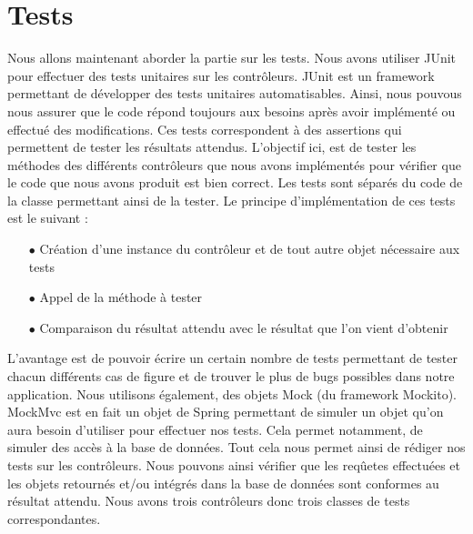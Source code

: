 \documentclass[a4paper]{report}
\begin{document}
\chapter{Tests}


Nous allons maintenant aborder la partie sur les tests. Nous avons utiliser JUnit pour effectuer des tests unitaires sur les contrôleurs. JUnit est un framework permettant de développer des tests unitaires
automatisables. Ainsi, nous pouvous nous assurer que le code répond toujours aux besoins après avoir implémenté ou effectué des modifications. Ces tests correspondent à des assertions qui permettent de tester les résultats 
attendus. L'objectif ici, est de tester les méthodes des différents contrôleurs que nous avons implémentés pour vérifier que le code que nous avons produit est bien correct.
Les tests sont séparés du code de la classe permettant ainsi de la tester. Le principe d'implémentation de ces tests est le suivant : \newline
\begin{itemize}
    \item[$\bullet$] Création d'une instance du contrôleur et de tout autre objet nécessaire aux tests
    \item[$\bullet$] Appel de la méthode à tester
    \item[$\bullet$] Comparaison du résultat attendu avec le résultat que l'on vient d'obtenir \newline
\end{itemize}
L'avantage est de pouvoir écrire un certain nombre de tests permettant de tester chacun différents cas de figure et de trouver le plus de bugs possibles dans notre application.
Nous utilisons également, des objets Mock (du framework Mockito). MockMvc est en fait un objet de Spring \cite{spring_testing_web} permettant de simuler un objet qu'on aura besoin d'utiliser pour effectuer nos tests. Cela permet notamment, de simuler
des accès à la base de données.
Tout cela nous permet ainsi de rédiger nos tests sur les contrôleurs. Nous pouvons ainsi vérifier que les reqûetes effectuées et les objets retournés et/ou intégrés dans la base de données
sont conformes au résultat attendu.
Nous avons trois contrôleurs donc trois classes de tests correspondantes.
\end{document}
